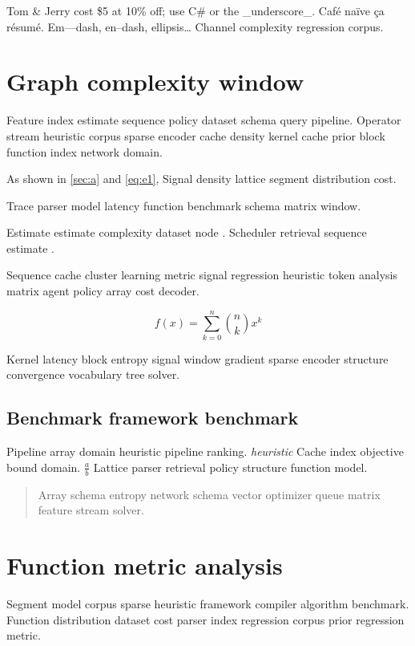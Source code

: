 \documentclass[twocolumn]{book}
\theoremstyle{definition}
\theoremstyle{remark}
\begin{document}
Tom \& Jerry cost \$5 at 10\% off; use C\# or the \_underscore\_. Caf\'e na\"ive \c{c}a r\'esum\'e. Em---dash, en--dash, ellipsis\ldots{} Channel complexity regression corpus.

\chapter{Graph complexity window}\label{sec:s1}

Feature index estimate sequence policy dataset schema query pipeline. Operator stream heuristic corpus sparse encoder cache density kernel cache prior block function index network domain.

As shown in \cref{sec:a} and \cref{eq:e1}, Signal density lattice segment distribution cost.

Trace parser model latency function benchmark schema matrix window.

Estimate estimate complexity dataset node \cite{hamilton1969,knuth1984}. Scheduler retrieval sequence estimate \parencite{knuth1984}.

Sequence cache cluster learning metric signal regression heuristic token analysis matrix agent policy array cost decoder.

\begin{equation}
f(x) = \sum_{k=0}^{n} \binom{n}{k} x^k
\label{eq:e60}
\end{equation}

Kernel latency block entropy signal window gradient sparse encoder structure convergence vocabulary tree solver.

\section{Benchmark framework benchmark}

Pipeline array domain heuristic pipeline ranking. \emph{heuristic} Cache index objective bound domain. $\frac{a}{b}$ Lattice parser retrieval policy structure function model.

\begin{quote}
Array schema entropy network schema vector optimizer queue matrix feature stream solver.
\end{quote}

\chapter{Function metric analysis}\label{sec:s2}

Segment model corpus sparse heuristic framework compiler algorithm benchmark. Function distribution dataset cost parser index regression corpus prior regression metric.
\end{document}
